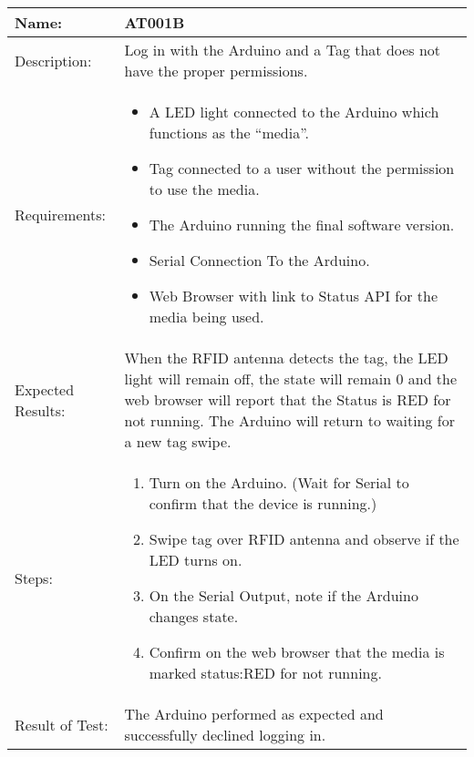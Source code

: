 \begin{table}[h]
	\centering
		\begin{tabular}{|l|p{9cm}|}
		\hline
		\hline
		Name: & AT001B\\
		\hline
		Description: & Log in with the Arduino and a Tag that does not have the proper permissions.\\
		\hline
		Requirements: &
		\begin{itemize}
		  \item A LED light connected to the Arduino which functions as the ``media''.
			\item Tag connected to a user without the permission to use the media.
			\item The Arduino running the final software version.
			\item Serial Connection To the Arduino.
			\item Web Browser with link to Status API for the media being used.
		\end{itemize}
		\\
		\hline
		Expected Results: & When the RFID antenna detects the tag, the LED light will remain off, the state will remain 0 and the web browser will report that the Status is RED for not running.
		The Arduino will return to waiting for a new tag swipe.\\
		\hline
		Steps: & 
		\begin{enumerate}
			\item Turn on the Arduino. (Wait for Serial to confirm that the device is running.)
			\item Swipe tag over RFID antenna and observe if the LED turns on.
			\item On the Serial Output, note if the Arduino changes state.
			\item Confirm on the web browser that the media is marked status:RED for not running.
		\end{enumerate}
		\\
		\hline
		Result of Test: & The Arduino performed as expected and successfully declined logging in.\\
		\hline
		\end{tabular}
\end{table}

